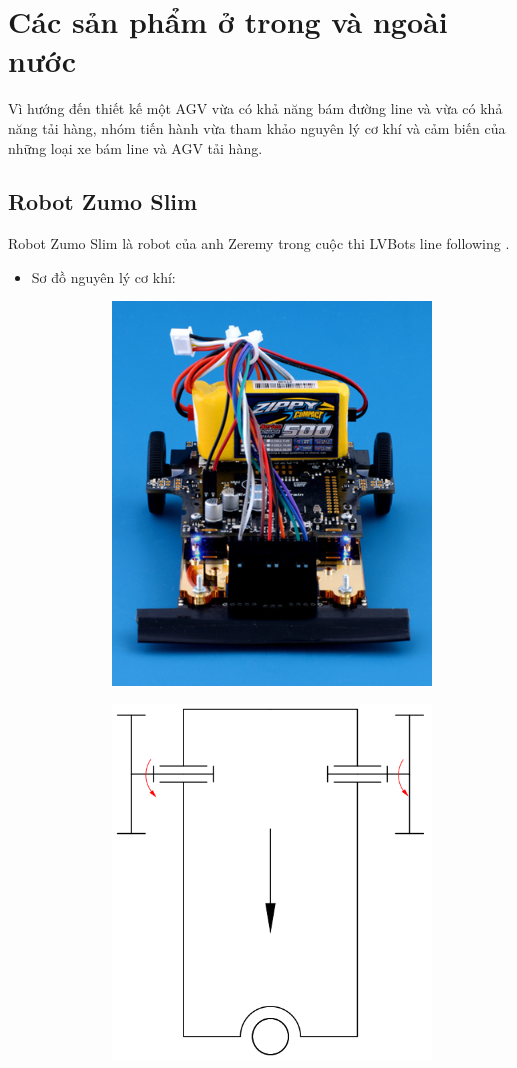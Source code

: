     \section{Các sản phẩm ở trong và ngoài nước}
    \hspace*{0.6cm}Vì hướng đến thiết kế một AGV vừa có khả năng bám đường line và vừa có khả năng tải hàng, nhóm tiến hành vừa tham khảo nguyên lý cơ khí và cảm biến của những loại xe bám line và AGV tải hàng. 
    \subsection{Robot Zumo Slim}
        \hspace*{0.6cm}Robot Zumo Slim là robot của anh Zeremy trong cuộc thi LVBots line following \cite{zumo_slim_robot}.
        \begin{itemize}
            \item Sơ đồ nguyên lý cơ khí:
            \begin{figure}[H]
                \begin{subfigure}{0.5\textwidth}
                \centering
                \includegraphics[width=0.5\linewidth, right]{pictures/chapter1/chapter1_pic_10a_zumo_slim.png} 
                \label{chap1_pic10a}
                \end{subfigure}
                \begin{subfigure}{0.6\textwidth}
                \includegraphics[width=0.5\linewidth]{pictures/chapter1/chapter1_pic_10b_zumo_slim.png}

\end{subfigure}
\end{figure}
\end{itemize}
